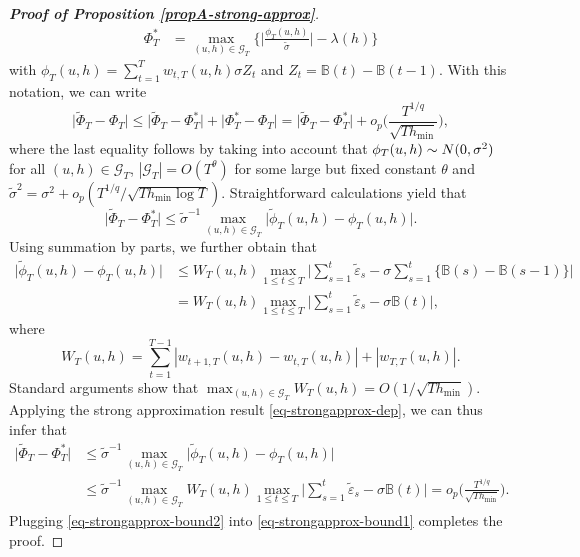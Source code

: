 \begin{proof}[\textnormal{\textbf{Proof of Proposition \ref{propA-strong-approx}}}]
\begin{align*}
\Phi_T^{*} & = \max_{(u,h) \in \mathcal{G}_T} \Big\{ \Big|\frac{\phi_T(u,h)}{\widetilde{\sigma}}\Big| - \lambda(h) \Big\} 
\end{align*}
with $\phi_T(u,h) = \sum\nolimits_{t=1}^T w_{t,T}(u,h) \sigma Z_t$ and $Z_t = \mathbb{B}(t) - \mathbb{B}(t-1)$. With this notation, we can write 
\begin{equation}\label{eq-strongapprox-bound1}
\big| \widetilde{\Phi}_T - \Phi_T \big| \le \big| \widetilde{\Phi}_T - \Phi_T^{*} \big| + \big| \Phi_T^{*} - \Phi_T \big| = \big| \widetilde{\Phi}_T - \Phi_T^{*} \big| + o_p \Big( \frac{T^{1/q}}{\sqrt{Th_{\min}}} \Big), 
\end{equation}
where the last equality follows by taking into account that $\phi_T(u,h) \sim N(0,\sigma^2)$ for all $(u,h) \in \mathcal{G}_T$, $|\mathcal{G}_T| = O(T^\theta)$ for some large but fixed constant $\theta$ and $\widetilde{\sigma}^2 = \sigma^2 + o_p(T^{1/q}/\sqrt{T h_{\min} \log T})$. Straightforward calculations yield that 
\[ \big| \widetilde{\Phi}_T - \Phi_T^{*} \big| \le \widetilde{\sigma}^{-1} \max_{(u,h) \in \mathcal{G}_T} \big| \widetilde{\phi}_T(u,h) - \phi_T(u,h) \big|. \]
Using summation by parts,
we further obtain that 
\begin{align*}
\big| \widetilde{\phi}_T(u,h) - \phi_T(u,h) \big| 
 & \le W_T(u,h) \max_{1 \le t \le T} \Big| \sum\limits_{s=1}^t \widetilde{\varepsilon}_s - \sigma \sum\limits_{s=1}^t \big\{ \mathbb{B}(s) - \mathbb{B}(s-1) \big\} \Big| \\
 & = W_T(u,h) \max_{1 \le t \le T} \Big| \sum\limits_{s=1}^t \widetilde{\varepsilon}_s - \sigma \mathbb{B}(t) \Big|,
\end{align*}
where
\[ W_T(u,h) = \sum\limits_{t=1}^{T-1} |w_{t+1,T}(u,h) - w_{t,T}(u,h)| + |w_{T,T}(u,h)|. \]
Standard arguments show that $\max_{(u,h) \in \mathcal{G}_T} W_T(u,h) = O( 1/\sqrt{Th_{\min}} )$. Applying the strong approximation result \eqref{eq-strongapprox-dep}, we can thus infer that 
\begin{align}
\big| \widetilde{\Phi}_T - \Phi_T^{*} \big| 
 & \le \widetilde{\sigma}^{-1} \max_{(u,h) \in \mathcal{G}_T} \big| \widetilde{\phi}_T(u,h) - \phi_T(u,h) \big| \nonumber \\
 & \le \widetilde{\sigma}^{-1} \max_{(u,h) \in \mathcal{G}_T} W_T(u,h) \max_{1 \le t \le T} \Big| \sum\limits_{s=1}^t \widetilde{\varepsilon}_s - \sigma \mathbb{B}(t) \Big| 
 = o_p \Big( \frac{T^{1/q}}{\sqrt{Th_{\min}}} \Big). \label{eq-strongapprox-bound2}
\end{align}
Plugging \eqref{eq-strongapprox-bound2} into \eqref{eq-strongapprox-bound1} completes the proof.
\end{proof}




